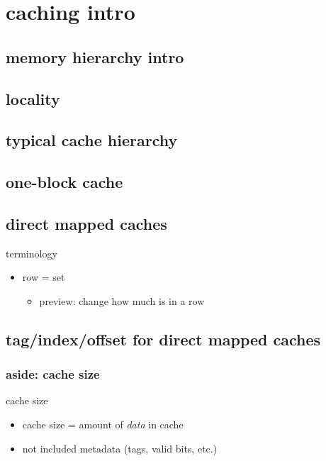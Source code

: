 \section{caching intro}

\subsection{memory hierarchy intro}


\subsection{locality}


\subsection{typical cache hierarchy}


\subsection{one-block cache}


\subsection{direct mapped caches}


\begin{frame}{terminology}
    \begin{itemize}
    \item row = set
        \begin{itemize}
        \item preview: change how much is in a row
        \end{itemize}
    \end{itemize}
\end{frame}

\subsection{tag/index/offset for direct mapped caches}


\subsubsection{aside: cache size}
\begin{frame}{cache size}
    \begin{itemize}
    \item cache size = amount of \textit{data} in cache
    \item not included metadata (tags, valid bits, etc.)
    \end{itemize}
\end{frame}

